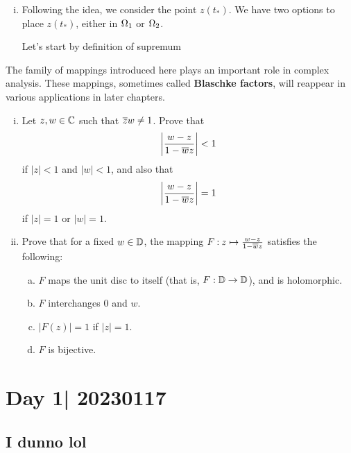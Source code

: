 \documentclass[12pt]{memoir}
\begin{document}
\begin{ptcbr}
    \begin{enumerate}[i)]
        \itemsep=-0.4em
        \item Following the idea, we consider the point $z(t_\ast)$. We have two options to place $z(t_\ast)$, either in $\Omega_1$ or $\Omega_2$.\par 
        Let's start by definition of supremum
    \end{enumerate}
\end{ptcbr}

\begin{Ej}
    The family of mappings introduced here plays an important role in complex analysis. These mappings, sometimes called \textbf{Blaschke factors}, will reappear in various applications in later chapters.
    \begin{enumerate}[i)]
        \itemsep=-0.4em
        \item Let $z,w\in\mathbb{C}$ such that $\overline{z}w\neq 1$. Prove that 
        $$\left|\frac{w-z}{1-\overline w z}\right|<1$$
        if $|z|<1$ and $|w|<1$, and also that 
        $$\left|\frac{w-z}{1-\overline w z}\right|=1$$
        if $|z|=1$ or $|w|=1$. 
        \item Prove that for a fixed $w\in\mathbb{D}$, the mapping $F\mathbin{:}z\mapsto\frac{w-z}{1-\overline w z}$ satisfies the following:
        \begin{enumerate}[a)]
            \itemsep=-0.4em
            \item $F$ maps the unit disc to itself (that is, $F:\mathbb{D}\to\mathbb{D}$), and is holomorphic.
            \item $F$ interchanges $0$ and $w$. 
            \item $|F(z)|=1$ if $|z|=1$.
            \item $F$ is bijective. 
        \end{enumerate}
    \end{enumerate}
    \end{Ej}
\section{Day 1| 20230117}

\subsection{I dunno lol}
\end{document}
